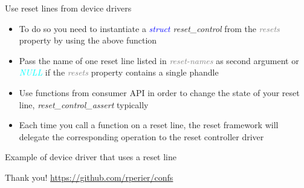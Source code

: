 \documentclass{beamer}
\begin{document}
\begin{frame}{Use reset lines from device drivers}
	
	\begin{itemize}
		\item To do so you need to instantiate a \textit{\textcolor{blue}{struct} reset\_control} from the \textit{\textcolor{gray}{resets}} property by using the above function
		\item Pass the name of one reset line listed in \textit{\textcolor{gray}{reset-names}} as second argument or \textit{\textcolor{cyan}{NULL}} if the \textit{\textcolor{gray}{resets}} property contains a single phandle 
		\item Use functions from consumer API in order to change the state of your reset line, \textit{reset\_control\_assert} typically
		\item Each time you call a function on a reset line, the reset framework will delegate the corresponding operation to the reset controller driver
	\end{itemize}
\end{frame}

\begin{frame}{Example of device driver that uses a reset line}
	
\end{frame}

\begin{frame}{Thank you!}
	\vfill
	\vfill
	\url{https://github.com/rperier/confs}
\end{frame}
\end{document}
